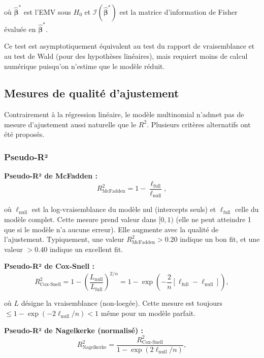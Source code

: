 \documentclass[12pt,a4paper]{article}
\begin{document}
où $\widehat{\boldsymbol{\beta}}^*$ est l'EMV sous $H_0$ et $\mathcal{I}(\widehat{\boldsymbol{\beta}}^*)$ est la matrice d'information de Fisher évaluée en $\widehat{\boldsymbol{\beta}}^*$.

Ce test est asymptotiquement équivalent au test du rapport de vraisemblance et au test de Wald (pour des hypothèses linéaires), mais requiert moins de calcul numérique puisqu'on n'estime que le modèle réduit.

\subsection{Mesures de qualité d'ajustement}

Contrairement à la régression linéaire, le modèle multinomial n'admet pas de mesure d'ajustement aussi naturelle que le $R^2$. Plusieurs critères alternatifs ont été proposés.

\subsubsection{Pseudo-R²}

\textbf{Pseudo-R² de McFadden :}
\begin{equation}\label{eq:r2-mcfadden}
R^2_{\text{McFadden}} = 1 - \frac{\ell_{\text{full}}}{\ell_{\text{null}}},
\end{equation}

où $\ell_{\text{null}}$ est la log-vraisemblance du modèle nul (intercepts seuls) et $\ell_{\text{full}}$ celle du modèle complet. Cette mesure prend valeur dans $[0, 1)$ (elle ne peut atteindre 1 que si le modèle n'a aucune erreur). Elle augmente avec la qualité de l'ajustement. Typiquement, une valeur $R^2_{\text{McFadden}} > 0.20$ indique un bon fit, et une valeur $> 0.40$ indique un excellent fit.

\textbf{Pseudo-R² de Cox-Snell :}
\begin{equation}\label{eq:r2-coxsnell}
R^2_{\text{Cox-Snell}} = 1 - \left( \frac{L_{\text{null}}}{L_{\text{full}}} \right)^{2/n} = 1 - \exp\left( -\frac{2}{n}[\ell_{\text{full}} - \ell_{\text{null}}] \right),
\end{equation}

où $L$ désigne la vraisemblance (non-loegée). Cette mesure est toujours $\leq 1 - \exp(-2\ell_{\text{null}}/n) < 1$ même pour un modèle parfait.

\textbf{Pseudo-R² de Nagelkerke (normalisé) :}
\begin{equation}\label{eq:r2-nagelkerke}
R^2_{\text{Nagelkerke}} = \frac{R^2_{\text{Cox-Snell}}}{1 - \exp(2\ell_{\text{null}}/n)},
\end{equation}
\end{document}
